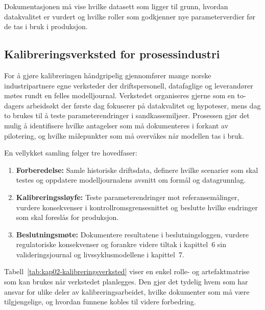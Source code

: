 Dokumentasjonen må vise hvilke datasett som ligger til grunn, hvordan datakvalitet er vurdert og hvilke roller som godkjenner nye
parameterverdier før de tas i bruk i produksjon.

\subsection{Kalibreringsverksted for prosessindustri}
For å gjøre kalibreringen håndgripelig gjennomfører mange norske industripartnere egne verksteder der driftspersonell, datafaglige og leverandører møtes rundt en felles modelljournal.\citep{sintef2021digital,equinor2021johansverdrup} Verkstedet organiseres gjerne som en to-dagers arbeidsøkt der første dag fokuserer på datakvalitet og hypoteser, mens dag to brukes til å teste parameterendringer i sandkassemiljøer. Prosessen gjør det mulig å identifisere hvilke antagelser som må dokumenteres i forkant av pilotering, og hvilke målepunkter som må overvåkes når modellen tas i bruk.

En vellykket samling følger tre hovedfaser:
\begin{enumerate}
    \item \textbf{Forberedelse:} Samle historiske driftsdata, definere hvilke scenarier som skal testes og oppdatere modelljournalens avsnitt om formål og datagrunnlag.
    \item \textbf{Kalibreringssløyfe:} Teste parameterendringer mot referansemålinger, vurdere konsekvenser i kontrollromsgrensesnittet og beslutte hvilke endringer som skal foreslås for produksjon.
    \item \textbf{Beslutningsmøte:} Dokumentere resultatene i beslutningsloggen, vurdere regulatoriske konsekvenser og forankre videre tiltak i kapittel~6 sin valideringsjournal og livssyklusmodellene i kapittel~7.\citep{dnv2023digitalassurance}
\end{enumerate}

Tabell~\ref{tab:kap02-kalibreringsverksted} viser en enkel rolle- og artefaktmatrise som kan brukes når verkstedet planlegges. Den gjør det tydelig hvem som har ansvar for ulike deler av kalibreringsarbeidet, hvilke dokumenter som må være tilgjengelige, og hvordan funnene kobles til videre forbedring.

